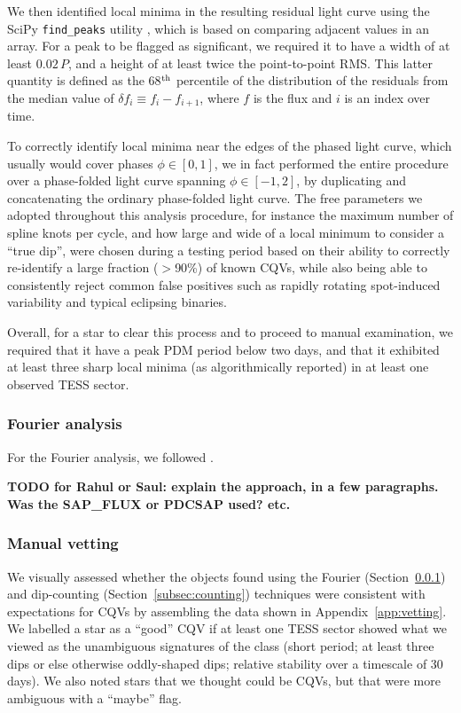 \documentclass[11pt,twocolumn,tighten]{aastex63}
\begin{document}
We then identified local minima in the resulting residual light curve
using the SciPy \texttt{find\_peaks} utility
\citep{2020NatMe..17..261V}, which is based on comparing adjacent
values in an array.  For a peak to be flagged as significant, we
required it to have a width of at least $0.02\,P$, and a height of at
least twice the point-to-point RMS.  This latter quantity is defined
as the 68$^{\rm th}$ percentile of the distribution of the residuals
from the median value of $\delta f_i \equiv f_i - f_{i+1}$, where $f$
is the flux and $i$ is an index over time.

To correctly identify local minima near the edges of the phased light
curve, which usually would cover phases $\phi \in [ 0,1 ]$, we in fact
performed the entire procedure over a phase-folded light curve
spanning $\phi \in [-1,2 ]$, by duplicating and concatenating the
ordinary phase-folded light curve.  The free parameters we adopted
throughout this analysis procedure, for instance the maximum number of
spline knots per cycle, and how large and wide of a local minimum to
consider a ``true dip'', were chosen during a testing period based on
their ability to correctly re-identify a large fraction ($>$90\%) of
known CQVs, while also being able to consistently reject common false
positives such as rapidly rotating spot-induced variability and
typical eclipsing binaries.

Overall, for a star to clear this process and to proceed to manual
examination, we required that it have a peak PDM period below two
days, and that it exhibited at least three sharp local minima (as
algorithmically reported) in at least one observed TESS sector.



\subsubsection{Fourier analysis}
\label{subsec:fourier}
For the Fourier analysis, we followed \citet{2019ApJ...876..127Z}.

{\bf TODO for Rahul or Saul: explain the approach, in a few
	paragraphs.  Was the SAP\_FLUX or PDCSAP used? etc. }

\subsubsection{Manual vetting}

We visually assessed whether the objects found using the Fourier
(Section~\ref{subsec:fourier}) and dip-counting
(Section~\ref{subsec:counting}) techniques were consistent with
expectations for CQVs by assembling the data shown in
Appendix~\ref{app:vetting}.  We labelled a star as a ``good'' CQV if
at least one TESS sector showed what we viewed as the unambiguous
signatures of the class (short period; at least three dips or else
otherwise oddly-shaped dips; relative stability over a timescale of
30\,days).  We also noted stars that we thought could be CQVs, but
that were more ambiguous with a ``maybe'' flag.
\end{document}
